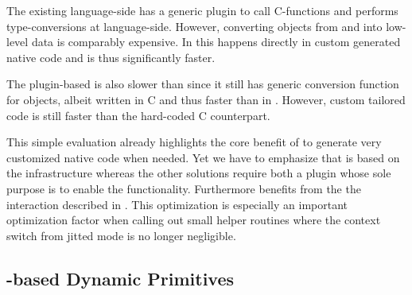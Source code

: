The existing language-side \FFI has a generic plugin to call C-functions and performs type-conversions at language-side.
However, converting \PH objects from and into low-level data is comparably expensive.
In \NB this happens directly in custom generated native code and is thus significantly faster.

The plugin-based \FFI is also slower than \NB since it still has generic conversion function for \PH objects, albeit written in C and thus faster than in \Alien.
However, \NB custom tailored \ASM code is still faster than the hard-coded C counterpart.

This simple \FFI evaluation already highlights the core benefit of \B to generate very customized native code when needed.
Yet we have to emphasize that \NB is based on the \B infrastructure whereas the other solutions require both a \VM plugin whose sole purpose is to enable the \FFI functionality.
Furthermore \NB benefits from the the \JIT interaction described in .
This optimization is especially an important optimization factor when calling out small helper routines where the context switch from jitted mode is no longer negligible.

\subsection{\B-based Dynamic Primitives}

